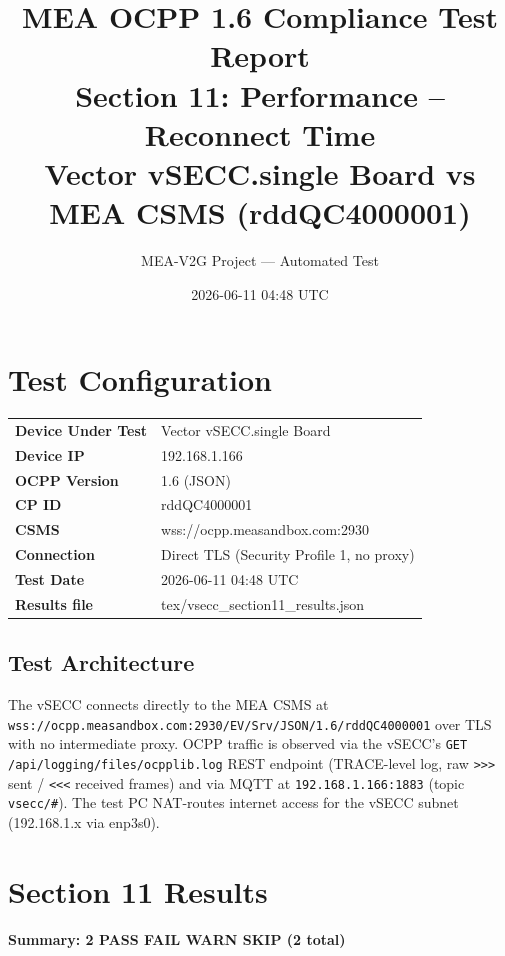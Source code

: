 \documentclass[10pt, a4paper]{article}
\title{\textbf{MEA OCPP 1.6 Compliance Test Report}\\[0.3em]
\large Section 11: Performance -- Reconnect Time\\[0.3em]
\normalsize Vector vSECC.single Board vs MEA CSMS (rddQC4000001)}
\author{MEA-V2G Project --- Automated Test}
\date{2026-06-11 04:48 UTC}
\begin{document}
\maketitle
\tableofcontents
\newpage

\section{Test Configuration}
\begin{tabular}{ll}
\textbf{Device Under Test} & Vector vSECC.single Board \\
\textbf{Device IP}         & 192.168.1.166 \\
\textbf{OCPP Version}      & 1.6 (JSON) \\
\textbf{CP ID}             & rddQC4000001 \\
\textbf{CSMS}              & wss://ocpp.measandbox.com:2930 \\
\textbf{Connection}        & Direct TLS (Security Profile 1, no proxy) \\
\textbf{Test Date}         & 2026-06-11 04:48 UTC \\
\textbf{Results file}      & tex/vsecc\_section11\_results.json \\
\end{tabular}

\subsection*{Test Architecture}
The vSECC connects directly to the MEA CSMS at
\texttt{wss://ocpp.measandbox.com:2930/EV/Srv/JSON/1.6/rddQC4000001}
over TLS with no intermediate proxy.
OCPP traffic is observed via the vSECC's \texttt{GET /api/logging/files/ocpplib.log}
REST endpoint (TRACE-level log, raw \texttt{>>>} sent / \texttt{<<<} received frames)
and via MQTT at \texttt{192.168.1.166:1883} (topic \texttt{vsecc/\#}).
The test PC NAT-routes internet access for the vSECC subnet (192.168.1.x via enp3s0).

\section{Section 11 Results}
\textbf{Summary: 2 PASS  FAIL  WARN  SKIP \quad (2 total)}
\end{document}
